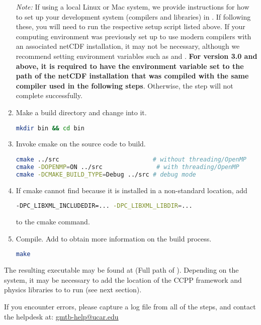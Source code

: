 \begin{enumerate}
\emph{Note:} If using a local Linux or Mac system, we provide instructions for how to set up your development system (compilers and libraries) in . If following these, you will need to run the respective setup script listed above. If your computing environment was previously set up to use modern compilers with an associated netCDF installation, it may not be necessary, although we recommend setting environment variables such as  and . \textbf{For version 3.0 and above, it is required to have the  environment variable set to the path of the netCDF installation that was compiled with the same compiler used in the following steps}. Otherwise, the  step will not complete successfully.

    \item Make a build directory and change into it.
\begin{lstlisting}[language=bash]
mkdir bin && cd bin
\end{lstlisting}
    \item Invoke cmake on the source code to build.
\begin{lstlisting}[language=bash]
cmake ../src                          # without threading/OpenMP
cmake -DOPENMP=ON ../src               # with threading/OpenMP
cmake -DCMAKE_BUILD_TYPE=Debug ../src # debug mode
\end{lstlisting}
    \item If cmake cannot find  because it is installed in a non-standard location, add
\begin{lstlisting}[language=bash]
-DPC_LIBXML_INCLUDEDIR=... -DPC_LIBXML_LIBDIR=...
\end{lstlisting}
    to the cmake command.
    \item Compile. Add  to obtain more information on the build process.
\begin{lstlisting}[language=bash]
make
\end{lstlisting}
\end{enumerate}

The resulting executable may be found at  (Full path of ). Depending on the system, it may be necessary to add the location of the CCPP framework and physics libraries to  to run  (see next section).

If you encounter errors, please capture a log file from all of the steps, and contact the helpdesk at: \url{gmtb-help@ucar.edu}

